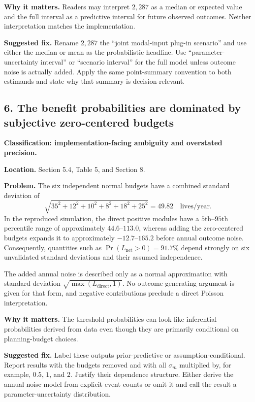 \documentclass[11pt]{article}
\begin{document}
\textbf{Why it matters.} Readers may interpret $2{,}287$ as a median or
expected value and the full interval as a predictive interval for future
observed outcomes.  Neither interpretation matches the implementation.

\textbf{Suggested fix.} Rename $2{,}287$ the ``joint modal-input plug-in
scenario'' and use either the median or mean as the probabilistic headline.
Use ``parameter-uncertainty interval'' or ``scenario interval'' for the full
model unless outcome noise is actually added.  Apply the same point-summary
convention to both estimands and state why that summary is decision-relevant.

\subsection*{6. The benefit probabilities are dominated by subjective zero-centered budgets}

\textbf{Classification: implementation-facing ambiguity and overstated
precision.}

\textbf{Location.} Section 5.4, Table 5, and Section 8.

\textbf{Problem.} The six independent normal budgets have a combined standard
deviation of
\[
\sqrt{35^2+12^2+10^2+8^2+18^2+25^2}=49.82
\quad\text{lives/year}.
\]
In the reproduced simulation, the direct positive modules have a $5$th--$95$th
percentile range of approximately $44.6$--$113.0$, whereas adding the
zero-centered budgets expands it to approximately $-12.7$--$165.2$ before
annual outcome noise.  Consequently, quantities such as
$\Pr(L_{\mathrm{net}}>0)=91.7\%$ depend strongly on six unvalidated standard
deviations and their assumed independence.

The added annual noise is described only as a normal approximation with
standard deviation $\sqrt{\max(L_{\mathrm{direct}},1)}$.  No outcome-generating
argument is given for that form, and negative contributions preclude a direct
Poisson interpretation.

\textbf{Why it matters.} The threshold probabilities can look like inferential
probabilities derived from data even though they are primarily conditional on
planning-budget choices.

\textbf{Suggested fix.} Label these outputs prior-predictive or
assumption-conditional.  Report results with the budgets removed and with all
$\sigma_m$ multiplied by, for example, $0.5$, $1$, and $2$.  Justify their
dependence structure.  Either derive the annual-noise model from explicit event
counts or omit it and call the result a parameter-uncertainty distribution.
\end{document}
